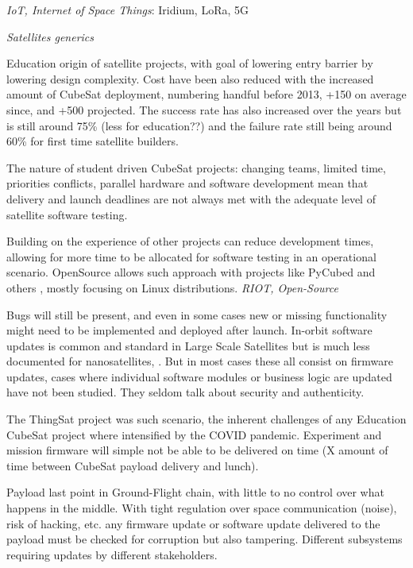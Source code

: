 \iffalse

\textit{IoT, Internet of Space Things}: Iridium, LoRa, 5G

\textit{Satellites generics}

Education origin of satellite projects, with goal of lowering entry barrier by
lowering design complexity. Cost have been also reduced with the increased
amount of CubeSat deployment, numbering handful before 2013, +150 on average since,
and +500 projected. The success rate has also increased over the years but is still
around 75\%\cite{villela2019towards1000} (less for education??) and the failure
rate still being around 60\% for first time satellite builders\cite{Holliday2019PyCubed}.

The nature of student driven CubeSat projects: changing teams, limited time,
priorities conflicts, parallel hardware and software development mean that delivery
and launch deadlines are not always met with the adequate level of satellite software
testing.

Building on the experience of other projects can reduce development times, allowing
for more time to be allocated for software testing in an operational scenario. OpenSource
allows such approach with projects like PyCubed\cite{Holliday2019PyCubed} and others
\cite{shalashov2021OpenSourceCubeSatReview}, mostly focusing on Linux distributions.
\textit{RIOT, Open-Source}

Bugs will still be present, and even in some cases new or missing functionality
might need to be implemented and deployed after launch. In-orbit software updates
is common and standard in Large Scale Satellites but is much less documented
for nanosatellites,\cite{sunter2016updatesnano} \cite{maison2021otaeducubesat}.
But in most cases these all consist on firmware updates, cases where individual
software modules or business logic are updated have not been studied. They seldom
talk about security and authenticity.

The ThingSat project was such scenario, the inherent challenges of any Education
CubeSat project where intensified by the COVID pandemic. Experiment and mission
firmware will simple not be able to be delivered on time (X amount of time between
CubeSat payload delivery and lunch).

Payload last point in Ground-Flight chain, with little to no control over what
happens in the middle. With tight regulation over space communication (noise),
risk of hacking, etc. any firmware update or software update delivered to the
payload must be checked for corruption but also tampering. Different subsystems
requiring updates by different stakeholders.

